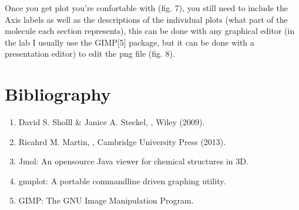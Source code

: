 \documentclass[letterpaper,10pt,english,openany,oneside]{sphinxmanual}
\begin{document}
\sphinxAtStartPar
Once you get plot you’re confortable with (fig. 7), you still need to include the Axis labels as well as the descriptions of the individual plots (what part of the molecule each section represents), this can be done with any graphical editor (in the lab I usually use the GIMP{[}5{]} package, but it can be done with a presentation editor) to edit the png file (fig. 8).

\begin{figure}[htbp]
\centering

\noindent{}
\end{figure}

\begin{figure}[htbp]
\centering

\noindent{}
\end{figure}


\section{Bibliography}
\label{\detokenize{tutorials/ddos/density_of_states:bibliography}}\begin{enumerate}
%
\item {} 
\sphinxAtStartPar
David S. Sholll \&  Janice A. Steckel, , Wiley (2009).

\item {} 
\sphinxAtStartPar
Ricahrd M. Martin, , Cambridge University Press (2013).

\item {} 
\sphinxAtStartPar
Jmol: An open\sphinxhyphen{}source Java viewer for chemical structures in 3D. 

\item {} 
\sphinxAtStartPar
gnuplot: A portable command\sphinxhyphen{}line driven graphing utility. 

\item {} 
\sphinxAtStartPar
GIMP: The GNU Image Manipulation Program. 

\end{enumerate}
\end{document}
